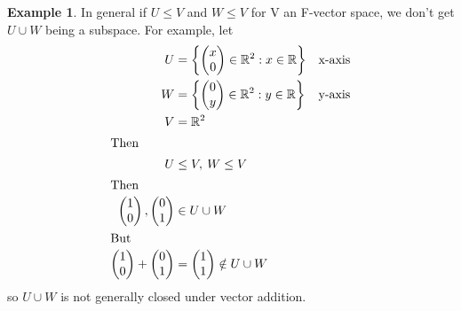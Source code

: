 \documentclass{report}
\theoremstyle{remark}
\theoremstyle{definition}
\theoremstyle{definition}
\newtheorem{example}[theorem]{Example}
\theoremstyle{theorem}
\begin{document}
\begin{example}
In general if $U \leq V$ and $W \leq V$ for V an F-vector space, we don't get $U \cup W$ being a subspace. For example, let
\begin{align*}
    U &= \left\{ \begin{pmatrix}x\\0\end{pmatrix} \in \mathbb{R}^2 : x \in \mathbb{R} \right\} & \text{x-axis}\\
    W &= \left\{ \begin{pmatrix}0\\y\end{pmatrix} \in \mathbb{R}^2 : y \in \mathbb{R} \right\} & \text{y-axis}\\
    V &= \mathbb{R}^2&\\
    \intertext{Then}
    U &\leq V, \> W \leq V&\\
    \intertext{Then}
    \begin{pmatrix}1\\0\end{pmatrix}, \begin{pmatrix}0\\1\end{pmatrix} & \in U \cup W&\\
    \intertext{But}
    \begin{pmatrix}1\\0\end{pmatrix}+\begin{pmatrix}0\\1\end{pmatrix}&=\begin{pmatrix}1\\1\end{pmatrix} \notin U \cup W&\\
\end{align*}
so $U \cup W$ is not generally closed under vector addition.
\end{example}
\end{document}
